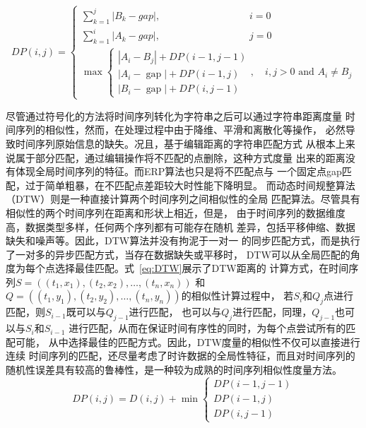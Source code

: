 \begin{equation}
  D P(i, j)= \begin{cases}\sum_{k=1}^{j}\left|B_{k}-g a p\right|, \qquad \qquad \qquad \qquad \quad i=0 \\
    \sum_{k=1}^{i}\left|A_{k}-g a p\right|,\qquad \qquad \qquad \qquad \quad j=0 \\
    \max \left\{\begin{array}{l}
    \left|A_{i}-B_{j}\right|+D P(i-1, j-1) \\
    \left|A_{i}-\operatorname{gap}\right|+D P(i-1, j) \\
    \left|B_{i}-\operatorname{gap}\right|+D P(i, j-1)
    \end{array}, \quad i, j>0 \text { and } A_{i} \neq B_{j}\right.\end{cases}
    \label{eq:ERP}
\end{equation}

尽管通过符号化的方法将时间序列转化为字符串之后可以通过字符串距离度量
时间序列的相似性，然而，在处理过程中由于降维、平滑和离散化等操作，
必然导致时间序列原始信息的缺失。况且，基于编辑距离的字符串匹配方式
从根本上来说属于部分匹配，通过编辑操作将不匹配的点删除，这种方式度量
出来的距离没有体现全局时间序列的特征。而ERP算法也只是将不匹配点与
一个固定点gap匹配，过于简单粗暴，在不匹配点差距较大时性能下降明显。
而动态时间规整算法（DTW）则是一种直接计算两个时间序列之间相似性的全局
匹配算法。尽管具有相似性的两个时间序列在距离和形状上相近，但是，
由于时间序列的数据维度高，数据类型多样，任何两个序列都有可能存在随机
差异，包括平移伸缩、数据缺失和噪声等。因此，DTW算法并没有拘泥于一对一
的同步匹配方式，而是执行了一对多的异步匹配方式，当存在数据缺失或平移时，
DTW可以从全局匹配的角度为每个点选择最佳匹配。式~\ref{eq:DTW}展示了DTW距离的
计算方式，在时间序列$S=((t_1,x_1 ),(t_2,x_2 ),\dots,(t_n,x_n ))$
和$Q=((t_1,y_1 ),(t_2,y_2 ),\dots,(t_n,y_n ))$的相似性计算过程中，
若$S_i$和$Q_j$点进行匹配，则$S_{i-1}$既可以与$Q_{j-1}$进行匹配，
也可以与$Q_j$进行匹配，同理，$Q_{j-1}$也可以与$S_i$和$S_{i-1}$
进行匹配，从而在保证时间有序性的同时，为每个点尝试所有的匹配可能，
从中选择最佳的匹配方式。因此，DTW度量的相似性不仅可以直接进行连续
时间序列的匹配，还尽量考虑了时许数据的全局性特征，而且对时间序列的
随机性误差具有较高的鲁棒性，是一种较为成熟的时间序列相似性度量方法。
\begin{equation}
  D P(i, j)=D(i, j)+\min \left\{\begin{array}{c}
    D P(i-1, j-1) \\
    D P(i-1, j) \\
    D P(i, j-1)
    \end{array}\right.
    \label{eq:DTW}
\end{equation}

